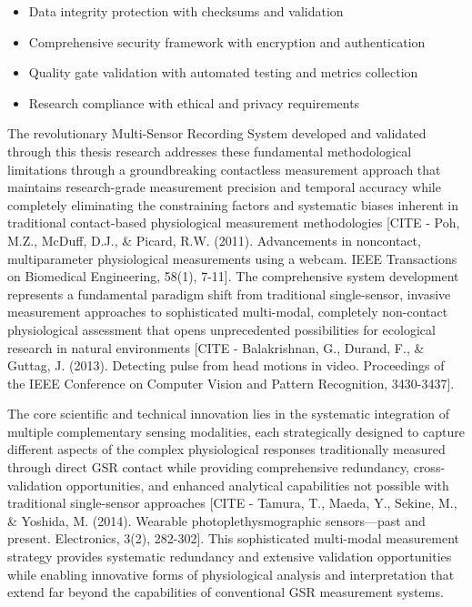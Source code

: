 \documentclass[11pt,a4paper]{report}
\begin{document}
\begin{itemize}
\item Data integrity protection with checksums and validation
\item Comprehensive security framework with encryption and authentication
\item Quality gate validation with automated testing and metrics collection
\item Research compliance with ethical and privacy requirements

\end{itemize}
The revolutionary Multi-Sensor Recording System developed and validated through this thesis research addresses these
fundamental methodological limitations through a groundbreaking contactless measurement approach that maintains
research-grade measurement precision and temporal accuracy while completely eliminating the constraining factors and
systematic biases inherent in traditional contact-based physiological measurement
methodologies [CITE - Poh, M.Z., McDuff, D.J., \& Picard, R.W. (2011). Advancements in noncontact, multiparameter physiological measurements using a webcam. IEEE Transactions on Biomedical Engineering, 58(1), 7-11].
The comprehensive system development represents a fundamental paradigm shift from traditional single-sensor, invasive
measurement approaches to sophisticated multi-modal, completely non-contact physiological assessment that opens
unprecedented possibilities for ecological research in natural
environments [CITE - Balakrishnan, G., Durand, F., \& Guttag, J. (2013). Detecting pulse from head motions in video. Proceedings of the IEEE Conference on Computer Vision and Pattern Recognition, 3430-3437].

The core scientific and technical innovation lies in the systematic integration of multiple complementary sensing
modalities, each strategically designed to capture different aspects of the complex physiological responses
traditionally measured through direct GSR contact while providing comprehensive redundancy, cross-validation
opportunities, and enhanced analytical capabilities not possible with traditional single-sensor
approaches [CITE - Tamura, T., Maeda, Y., Sekine, M., \& Yoshida, M. (2014). Wearable photoplethysmographic sensors—past and present. Electronics, 3(2), 282-302].
This sophisticated multi-modal measurement strategy provides systematic redundancy and extensive validation
opportunities while enabling innovative forms of physiological analysis and interpretation that extend far beyond the
capabilities of conventional GSR measurement systems.
\end{document}

